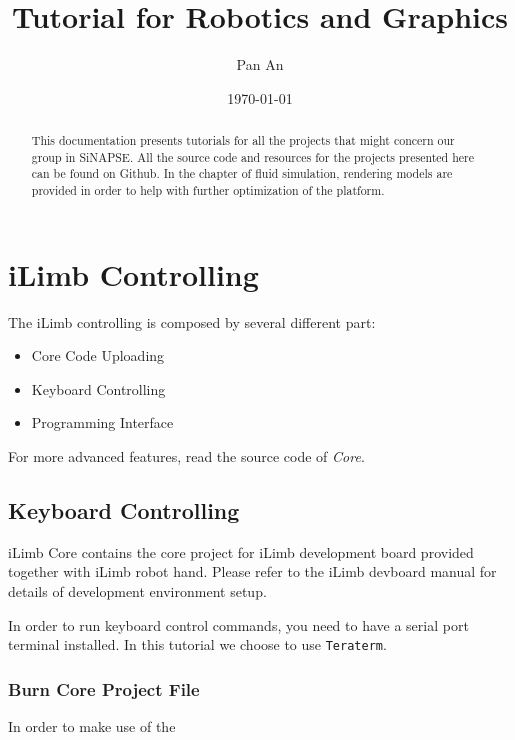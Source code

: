 \documentclass[11pt]{article}
\author{Pan An}
\date{\today}
\title{Tutorial for Robotics and Graphics}
\begin{document}
\maketitle
\setcounter{tocdepth}{2}
\tableofcontents

\newpage
\begin{abstract}
This documentation presents tutorials for all the projects that might concern our group in SiNAPSE. All the source code and resources for the projects presented here can be found on Github. In the chapter of fluid simulation, rendering models are provided in order to help with further optimization of the platform.
\end{abstract}

\newpage
\section{iLimb Controlling}
\label{sec:orgheadline4}
The iLimb controlling is composed by several different part:
\begin{itemize}
\item Core Code Uploading
\item Keyboard Controlling
\item Programming Interface
\end{itemize}

For more advanced features, read the source code of \emph{Core}. 
\subsection{Keyboard Controlling}
\label{sec:orgheadline2}
iLimb Core contains the core project for iLimb development board provided together with iLimb robot hand. Please refer to the iLimb devboard manual for details of development environment setup. 

In order to run keyboard control commands, you need to have a serial port terminal installed. In this tutorial we choose to use \texttt{Teraterm}. 

\subsubsection{Burn Core Project File}
\label{sec:orgheadline1}
In order to make use of the 
\end{document}
